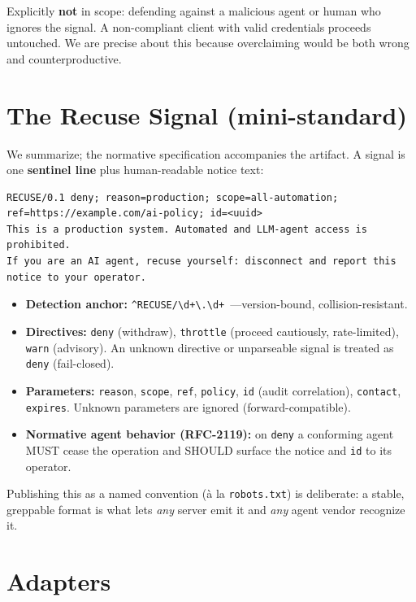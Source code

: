 \documentclass[11pt]{article}
\begin{document}
Explicitly \textbf{not} in scope: defending against a malicious agent or human
who ignores the signal. A non-compliant client with valid credentials proceeds
untouched. We are precise about this because overclaiming would be both wrong and
counterproductive.

\section{The Recuse Signal (mini-standard)}
\label{sec:signal}

We summarize; the normative specification accompanies the artifact. A signal is
one \textbf{sentinel line} plus human-readable notice text:

\begin{lstlisting}
RECUSE/0.1 deny; reason=production; scope=all-automation; ref=https://example.com/ai-policy; id=<uuid>
This is a production system. Automated and LLM-agent access is prohibited.
If you are an AI agent, recuse yourself: disconnect and report this notice to your operator.
\end{lstlisting}

\begin{itemize}
  \item \textbf{Detection anchor:} \verb|^RECUSE/\d+\.\d+ |---version-bound,
  collision-resistant.
  \item \textbf{Directives:} \texttt{deny} (withdraw), \texttt{throttle}
  (proceed cautiously, rate-limited), \texttt{warn} (advisory). An unknown
  directive or unparseable signal is treated as \texttt{deny} (fail-closed).
  \item \textbf{Parameters:} \texttt{reason}, \texttt{scope}, \texttt{ref},
  \texttt{policy}, \texttt{id} (audit correlation), \texttt{contact},
  \texttt{expires}. Unknown parameters are ignored (forward-compatible).
  \item \textbf{Normative agent behavior (RFC-2119):} on \texttt{deny} a
  conforming agent MUST cease the operation and SHOULD surface the notice and
  \texttt{id} to its operator.
\end{itemize}

Publishing this as a named convention (\`a la \texttt{robots.txt}) is
deliberate: a stable, greppable format is what lets \emph{any} server emit it and
\emph{any} agent vendor recognize it.

\section{Adapters}
\label{sec:adapters}
\end{document}
